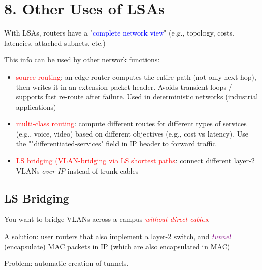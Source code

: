 \documentclass[11pt]{article}
\begin{document}
\section*{8. Other Uses of LSAs}

With LSAs, routers have a "\textcolor{blue}{complete network view}" (e.g., topology, costs, latencies, attached subnets, etc.)

This info can be used by other network functions:
\begin{itemize}
	\item \textcolor{red}{source routing}: an edge router computes the entire path (not only next-hop), then writes it in an extension packet header. Avoids transient loops / supports fast re-route after failure. Used in deterministic networks (industrial applications)
	\item \textcolor{red}{multi-class routing}: compute different routes for different types of services (e.g., voice, video) based on different objectives (e.g., cost vs latency). Use the ""differentiated-services" field in IP header to forward traffic
	\item \textcolor{red}{LS bridging (VLAN-bridging via LS shortest paths}: connect different layer-2 VLANs \textit{over IP} instead of trunk cables
\end{itemize}

\subsection*{LS Bridging}
You want to bridge VLANs across a campus \textcolor{red}{\textit{without direct cables}}.

A solution: user routers that also implement a layer-2 switch, and \textcolor{purple}{\textit{tunnel}} (encapsulate) MAC packets in IP (which are also encapsulated in MAC)

Problem: automatic creation of tunnels.
\end{document}
